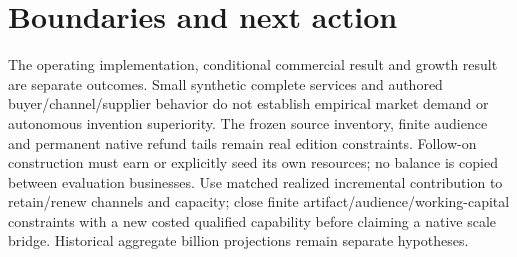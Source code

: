 \documentclass[10pt,letterpaper]{article}
\begin{document}
\section{Boundaries and next action}
The operating implementation, conditional commercial result and growth result are separate outcomes. Small synthetic complete services and authored buyer/channel/supplier behavior do not establish empirical market demand or autonomous invention superiority. The frozen source inventory, finite audience and permanent native refund tails remain real edition constraints. Follow-on construction must earn or explicitly seed its own resources; no balance is copied between evaluation businesses. Use matched realized incremental contribution to retain/renew channels and capacity; close finite artifact/audience/working-capital constraints with a new costed qualified capability before claiming a native scale bridge. Historical aggregate billion projections remain separate hypotheses.
\end{document}
